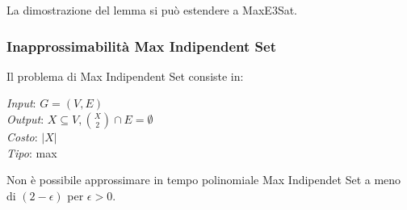 \begin{remark}
    La dimostrazione del lemma si può estendere a MaxE3Sat.
\end{remark}

\subsubsection{Inapprossimabilità Max Indipendent Set}
Il problema di Max Indipendent Set consiste in:

\emph{Input}: $G = (V,E)$\\
\emph{Output}: $X \subseteq V, \binom{X}{2}\cap E = \emptyset$\\
\emph{Costo}: $|X|$\\
\emph{Tipo}: max

\begin{theorem}
    Non è possibile approssimare in tempo polinomiale Max Indipendet Set a 
    meno di $(2-\epsilon)$ per $\epsilon > 0$.
\end{theorem}
